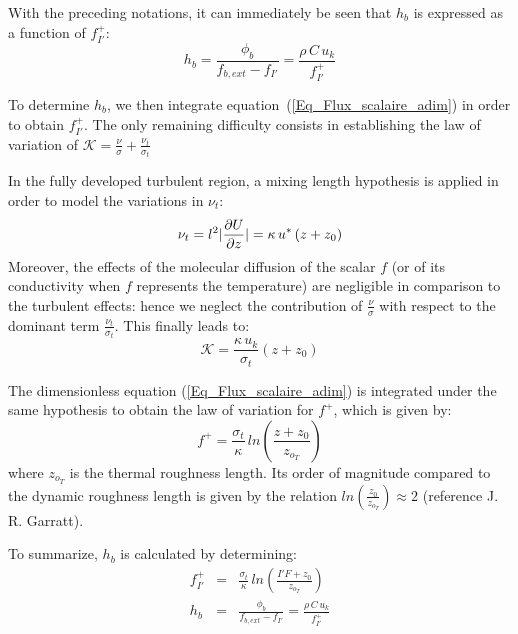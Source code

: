 With the preceding notations, it can immediately be seen that
$h_b$ is expressed as a function of $f^+_{I'}$:
\begin{equation}
h_b=\displaystyle\frac{\phi_b}{f_{b,ext}-f_{I'}}=\frac{\rho\,C\,u_k}{f^+_{I'}}
\end{equation}

To determine $h_b$, we then integrate equation~(\ref{Eq_Flux_scalaire_adim})
in order to obtain $f^+_{I'}$. The only remaining difficulty consists in
establishing the law of variation of
$\mathcal{K}=\displaystyle\frac{\nu}{\sigma}+
              \displaystyle\frac{\nu_t} {\sigma_t}$


In the fully developed turbulent region, a mixing length hypothesis
is applied in order to model the variations in $\nu_t$:
\begin{equation}
\nu_t = l^2 \arrowvert \frac{\partial U}{\partial z} \arrowvert =
\kappa\,u^* \left(z + z_0\right)
\end{equation}
Moreover, the effects of the molecular diffusion of the scalar $f$
(or of its conductivity when $f$ represents the temperature)
are negligible in comparison to the turbulent effects: hence we neglect
the contribution of $\displaystyle\frac{\nu}{\sigma}$ with respect to the
dominant term $\displaystyle\frac{\nu_t}{\sigma_t}$. This finally leads
to:
\begin{equation}
\mathcal{K}= \displaystyle\frac{\kappa \,u_k}{\sigma_t}  \left(z+z_0\right)
\end{equation}


The dimensionless equation (\ref{Eq_Flux_scalaire_adim}) is integrated
under the same hypothesis to obtain the law of variation for $f^+$, which
is given by:
\begin{equation}
f^+ = \displaystyle\frac{\sigma_t}{\kappa}\,
        ln\left(\displaystyle\frac{z+z_0}{z_{o_T}}\right)
\end{equation}
where $z_{o_T}$ is the thermal roughness length. Its order of
magnitude compared to the dynamic roughness length is given by the
relation $ln\left(\displaystyle\frac{z_0}{z_{o_T}}\right) \approx 2$ (reference J. R. Garratt).

To summarize, $h_b$ is calculated by determining:
\begin{eqnarray}
f^+_{I'}&=& \displaystyle\frac{\sigma_t}{\kappa}\,
 ln\left(\displaystyle\frac{I'F+z_0}{z_{o_T}}\right) \\
h_b&=&\displaystyle\frac{\phi_b}{f_{b,ext}-f_{I'}}=\frac{\rho\,C\,u_k}{f^+_{I'}}
\end{eqnarray}
